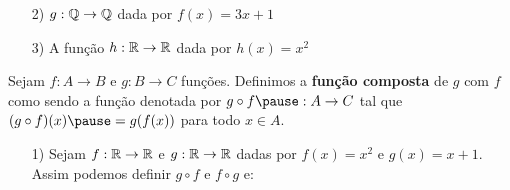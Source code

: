 \documentclass{beamer}
\begin{document}
    \begin{frame}
        \begin{exemplos}
            \begin{enumerate}
                \item[2)] $g : \mathbb{Q} \to \mathbb{Q}$ dada por $f(x) = 3x + 1$
            \end{enumerate}
        \end{exemplos}

        \vspace{5cm}
    \end{frame}

    \begin{frame}
        \vspace{5cm}
    \end{frame}

    \begin{frame}
        \begin{exemplos}
            \begin{enumerate}
                \item[3)] A fun\c{c}\~ao $h :\mathbb{R} \to \mathbb{R}$ dada por $h(x) = x^2$
            \end{enumerate}
        \end{exemplos}

        \vspace{5cm}
    \end{frame}

    \begin{frame}
        \vspace{5cm}
    \end{frame}

    \begin{frame}
        \begin{definicao}
            Sejam $f : A \to B$ \pause e $g : B \to C$ \pause fun\c{c}\~oes. \pause Definimos a \textbf{fun\c{c}\~ao composta} \pause de $g$ com $f$ \pause como sendo a fun\c{c}\~ao denotada por $g \circ f \pause : A \to C$ \pause tal que \pause $(g\circ f)(x) \pause = g(f(x))$ \pause para todo $x \in A$.\pause
        \end{definicao}

        \vspace{5cm}
    \end{frame}

    \begin{frame}
        \begin{exemplos}
            \begin{enumerate}
                \item[1)] Sejam $f : \mathbb{R} \to \mathbb{R}$ \pause e $g : \mathbb{R} \to \mathbb{R}$ \pause dadas por $f(x) = x^2$ \pause e $g(x) = x + 1$. \pause Assim podemos definir $g \circ f$ \pause e $f \circ g$ e:\pause
            \end{enumerate}
        \end{exemplos}

        \vspace{5cm}
    \end{frame}
    
\end{document}
